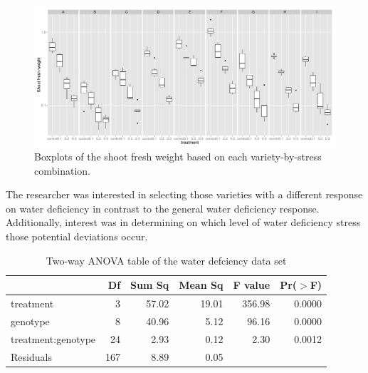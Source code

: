 \documentclass[12pt]{article}\usepackage[]{graphicx}\usepackage[]{color}
\makeatletter
\def\maxwidth{ %
  \ifdim\Gin@nat@width>\linewidth
    \linewidth
  \else
    \Gin@nat@width
  \fi
}
\newenvironment{knitrout}{}{} %
\makeatother
\begin{document}
\begin{knitrout}
\color{fgcolor}\begin{figure}[]

\includegraphics[width=\maxwidth]{figure/chunk41} \caption[Boxplots of the shoot fresh weight based on each variety-by-stress combination]{Boxplots of the shoot fresh weight based on each variety-by-stress combination.\label{fig:chunk41}}
\end{figure}


\end{knitrout}


The researcher was interested in selecting those varieties with a different response on water deficiency in contrast to the general water deficiency response. Additionally, interest was in determining on which level of water deficiency stress those potential deviations occur.  
\begin{table}[ht]
\centering
\begin{tabular}{lrrrrr}
  \hline
 & Df & Sum Sq & Mean Sq & F value & Pr($>$F) \\ 
  \hline
treatment & 3 & 57.02 & 19.01 & 356.98 & 0.0000 \\ 
  genotype & 8 & 40.96 & 5.12 & 96.16 & 0.0000 \\ 
  treatment:genotype & 24 & 2.93 & 0.12 & 2.30 & 0.0012 \\ 
  Residuals & 167 & 8.89 & 0.05 &  &  \\ 
   \hline
\end{tabular}
\caption{Two-way ANOVA table of the water defciency data set} 
\end{table}
\end{document}
